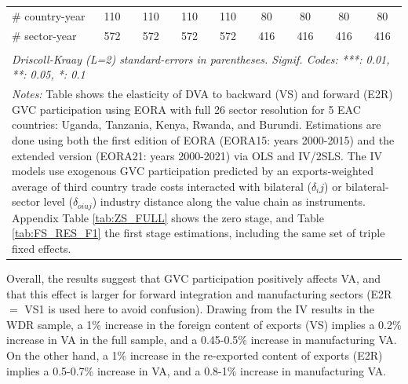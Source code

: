 \documentclass[a4paper]{article}
\begin{document}
\begin{table}[h!]
{\begin{tabular}{lcccccccc}
      \# country-year         & 110            & 110                   & 110                   & 110                   & 80       & 80                    & 80                    & 80\\  
      \# sector-year          & 572            & 572                   & 572                   & 572                   & 416      & 416                   & 416                   & 416\\  
      \bottomrule \\ [-0.9em]
      \multicolumn{9}{l}{\emph{Driscoll-Kraay (L=2) standard-errors in parentheses. Signif. Codes: ***: 0.01, **: 0.05, *: 0.1}}\\
      \multicolumn{9}{l}{\parbox{1.25\textwidth}{\scriptsize
\textit{Notes:} Table shows the elasticity of DVA to backward (VS) and forward (E2R) GVC participation using EORA with full 26 sector resolution for 5 EAC countries: Uganda, Tanzania, Kenya, Rwanda, and Burundi. Estimations are done using both the first edition of EORA (EORA15: years 2000-2015) and the extended version (EORA21: years 2000-2021) via OLS and IV/2SLS. The IV models use exogenous GVC participation predicted by an exports-weighted average of third country trade costs interacted with bilateral ($\delta_ij$) or bilateral-sector level ($\delta_{oiuj}$) industry distance along the value chain as instruments. Appendix Table \ref{tab:ZS_FULL} shows the zero stage, and Table \ref{tab:FS_RES_F1} the first stage estimations, including the same set of triple fixed effects. }}
   \end{tabular}
   }
\end{table}
\FloatBarrier

Overall, the results suggest that GVC participation positively affects VA, and that this effect is larger for forward integration and manufacturing sectors (E2R $=$ VS1 is used here to avoid confusion). Drawing from the IV results in the WDR sample, a 1\% increase in the foreign content of exports (VS) implies a 0.2\% increase in VA in the full sample, and a 0.45-0.5\% increase in manufacturing VA. On the other hand, a 1\% increase in the re-exported content of exports (E2R) implies a 0.5-0.7\% increase in VA, and a 0.8-1\% increase in manufacturing VA. 
\end{document}
